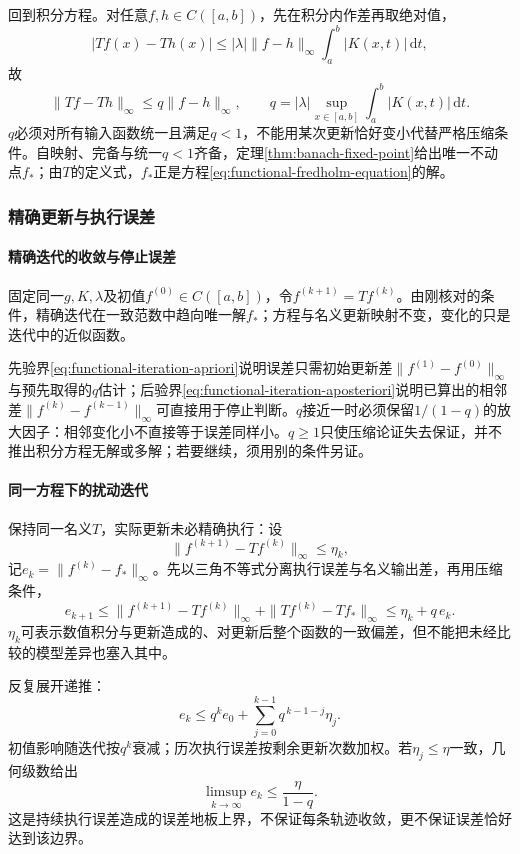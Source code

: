 回到积分方程。对任意$f,h\in C([a,b])$，先在积分内作差再取绝对值，
\[
|Tf(x)-Th(x)|\le|\lambda|\|f-h\|_\infty\int_a^b|K(x,t)|\,\mathrm dt,
\]
故
\[
\|Tf-Th\|_\infty\le q\|f-h\|_\infty,\qquad
q=|\lambda|\sup_{x\in[a,b]}\int_a^b|K(x,t)|\,\mathrm dt.
\]
$q$必须对所有输入函数统一且满足$q<1$，不能用某次更新恰好变小代替严格压缩条件。自映射、完备与统一$q<1$齐备，定理\ref{thm:banach-fixed-point}给出唯一不动点$f_*$；由$T$的定义式，$f_*$正是方程\eqref{eq:functional-fredholm-equation}的解。

\subsubsection{精确更新与执行误差}
\label{subsubsec:exact-inexact-updates}

\paragraph{精确迭代的收敛与停止误差}

固定同一$g,K,\lambda$及初值$f^{(0)}\in C([a,b])$，令$f^{(k+1)}=Tf^{(k)}$。由刚核对的条件，精确迭代在一致范数中趋向唯一解$f_*$；方程与名义更新映射不变，变化的只是迭代中的近似函数。

先验界\eqref{eq:functional-iteration-apriori}说明误差只需初始更新差$\|f^{(1)}-f^{(0)}\|_\infty$与预先取得的$q$估计；后验界\eqref{eq:functional-iteration-aposteriori}说明已算出的相邻差$\|f^{(k)}-f^{(k-1)}\|_\infty$可直接用于停止判断。$q$接近一时必须保留$1/(1-q)$的放大因子：相邻变化小不直接等于误差同样小。$q\ge1$只使压缩论证失去保证，并不推出积分方程无解或多解；若要继续，须用别的条件另证。

\paragraph{同一方程下的扰动迭代}

保持同一名义$T$，实际更新未必精确执行：设
\[
\|f^{(k+1)}-Tf^{(k)}\|_\infty\le\eta_k,
\]
记$e_k=\|f^{(k)}-f_*\|_\infty$。先以三角不等式分离执行误差与名义输出差，再用压缩条件，
\begin{equation}
\label{eq:functional-perturbed-iteration}
e_{k+1}
\le\|f^{(k+1)}-Tf^{(k)}\|_\infty+\|Tf^{(k)}-Tf_*\|_\infty
\le\eta_k+q\,e_k.
\end{equation}
$\eta_k$可表示数值积分与更新造成的、对更新后整个函数的一致偏差，但不能把未经比较的模型差异也塞入其中。

反复展开递推：
\begin{equation}
\label{eq:functional-perturbed-unrolling}
e_k\le q^k e_0+\sum_{j=0}^{k-1}q^{\,k-1-j}\eta_j.
\end{equation}
初值影响随迭代按$q^k$衰减；历次执行误差按剩余更新次数加权。若$\eta_j\le\eta$一致，几何级数给出
\[
\limsup_{k\to\infty}e_k\le\frac{\eta}{1-q}.
\]
这是持续执行误差造成的误差地板上界，不保证每条轨迹收敛，更不保证误差恰好达到该边界。

